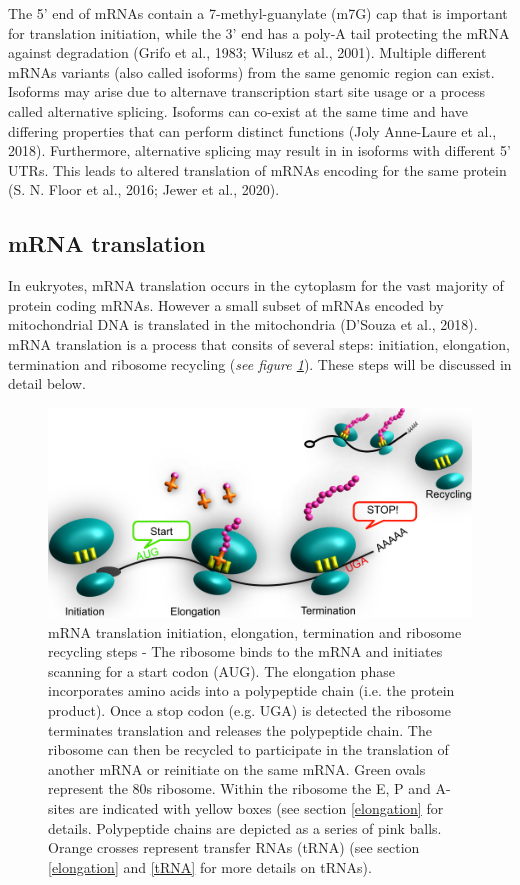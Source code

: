 \documentclass[12pt,openany]{book}
\begin{document}
The 5' end of mRNAs contain a 7-methyl-guanylate (m7G) cap that is
important for translation initiation, while the 3' end has a poly-A tail
protecting the mRNA against degradation (Grifo et al., 1983; Wilusz et
al., 2001). Multiple different mRNAs variants (also called isoforms)
from the same genomic region can exist. Isoforms may arise due to
alternave transcription start site usage or a process called alternative
splicing. Isoforms can co-exist at the same time and have differing
properties that can perform distinct functions (Joly Anne-Laure et al.,
2018). Furthermore, alternative splicing may result in in isoforms with
different 5' UTRs. This leads to altered translation of mRNAs encoding
for the same protein (S. N. Floor et al., 2016; Jewer et al., 2020).

\subsection{mRNA translation} \label{translation}

In eukryotes, mRNA translation occurs in the cytoplasm for the vast
majority of protein coding mRNAs. However a small subset of mRNAs
encoded by mitochondrial DNA is translated in the mitochondria (D'Souza
et al., 2018). mRNA translation is a process that consits of several
steps: initiation, elongation, termination and ribosome recycling
(\emph{see figure \ref{fig:doodlemRNASteps}}). These steps will be
discussed in detail below.

\begin{figure}
  \includegraphics{./figures/doodleTranslation.pdf}
  \caption{mRNA translation initiation, elongation, termination and ribosome recycling steps - The ribosome binds to the mRNA and initiates scanning for a start codon (AUG). The elongation phase incorporates amino acids into a polypeptide chain (i.e. the protein product). Once a stop codon (e.g. UGA) is detected the ribosome terminates translation and releases the polypeptide chain. The ribosome can then be recycled to participate in the translation of another mRNA or reinitiate on the same mRNA. Green ovals represent the 80s ribosome. Within the ribosome the E, P and A-sites are indicated with yellow boxes (see section \ref{elongation} for details. Polypeptide chains are depicted as a series of pink balls. Orange crosses represent transfer RNAs (tRNA) (see section \ref{elongation} and \ref{tRNA} for more details on tRNAs).  \label{fig:doodlemRNASteps}}
\end{figure}
\end{document}
